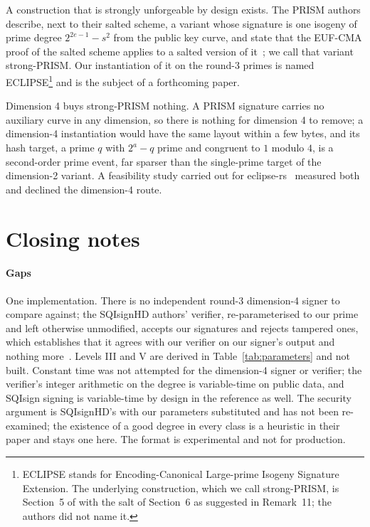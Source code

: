 \documentclass[11pt]{article}
\newcommand{\sP}{strong-PRISM}
\newcommand{\ECL}{ECLIPSE}
\begin{document}
A construction that is strongly unforgeable by design exists.  The PRISM
authors describe, next to their salted scheme, a variant whose signature
is one isogeny of prime degree $2^{2e-1} - s^2$ from the public key curve,
and state that the EUF-CMA proof of the salted scheme applies to a salted
version of it~\cite[Section~5 and Remark~11]{PRISMsalt}; we call that
variant \sP{}.  Our instantiation of it on the round-3 primes is named
\ECL{}\footnote{ECLIPSE stands for Encoding-Canonical Large-prime Isogeny
Signature Extension.  The underlying construction, which we call
strong-PRISM, is Section~5 of \cite{PRISMsalt} with the salt of Section~6
as suggested in Remark~11; the authors did not name it.} and is the
subject of a forthcoming paper.

Dimension 4 buys \sP{} nothing.  A PRISM signature carries no auxiliary
curve in any dimension, so there is nothing for dimension 4 to remove; a
dimension-4 instantiation would have the same layout within a few bytes,
and its hash target, a prime $q$ with $2^a - q$ prime and congruent to $1$
modulo $4$, is a second-order prime event, far sparser than the
single-prime target of the dimension-2 variant.  A feasibility study
carried out for eclipse-rs~\cite{PRISMrs} measured both and declined the
dimension-4 route.

\section{Closing notes}
\label{sec:closing}

\paragraph{Gaps}
One implementation.  There is no independent round-3 dimension-4 signer to
compare against; the SQIsignHD authors' verifier, re-parameterised to our
prime and left otherwise unmodified, accepts our signatures and rejects
tampered ones, which establishes that it agrees with our verifier on our
signer's output and nothing more~\cite{SQISignHDlib}.
Levels III and V are derived in Table~\ref{tab:parameters} and not built.
Constant time was not attempted for the dimension-4 signer or verifier;
the verifier's integer arithmetic on the degree is variable-time on public
data, and SQIsign signing is variable-time by design in the reference as
well.  The security argument is SQIsignHD's with our parameters
substituted and has not been re-examined; the existence of a good degree
in every class is a heuristic in their paper and stays one here.  The
format is experimental and not for production.
\end{document}

